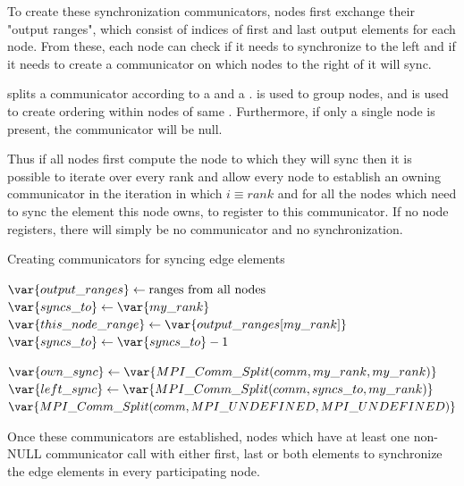 \documentclass[thesis=M,english]{FITthesis}[2019/12/23]
\begin{document}
To create these synchronization communicators, nodes first exchange their "output ranges",
which consist of indices of first and last output elements for each node. From
these, each node can check if it needs to synchronize to the left and if it needs to
create a communicator on which nodes to the right of it will sync.

 splits a communicator according to a  and a .
 is used to group nodes, and  is used to create ordering within nodes
of same . Furthermore, if only a single node is present, the communicator will
be null.

Thus if all nodes first compute the node to which they will sync then it is possible
to iterate over every rank and allow every node to establish an owning communicator
in the iteration in which $i \equiv rank$ and for all the nodes which need to sync
the element this node owns, to register to this communicator. If no node registers,
there will simply be no communicator and no synchronization.

\begin{algorithm}
    \caption{Creating communicators for syncing edge elements}
    \begin{algorithmic}
        \State $\var{output\_ranges} \gets \text{ranges from all nodes}$
        \State $\var{syncs\_to} \gets \var{my\_rank}$
        \State $\var{this\_node\_range} \gets \var{output\_ranges[my\_rank]}$
        \State $\var{syncs\_to} \gets \var{syncs\_to} - 1$
        \EndWhile

        \State $\var{own\_sync} \gets \var{MPI\_Comm\_Split(comm, my\_rank, my\_rank)}$
        \State $\var{left\_sync} \gets \var{MPI\_Comm\_Split(comm, syncs\_to, my\_rank)}$
        \Else {}
        \State $\var{MPI\_Comm\_Split(comm, MPI\_UNDEFINED, MPI\_UNDEFINED)}$
        \EndIf
        \EndFor
        \EndFunction
    \end{algorithmic}
\end{algorithm}

Once these communicators are established, nodes which have at least one non-NULL
communicator call  with either first, last or both elements
to synchronize the edge elements in every participating node.
\end{document}
